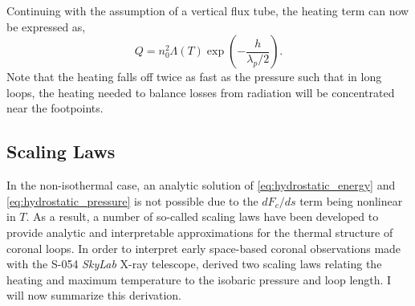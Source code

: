 Continuing with the assumption of a vertical flux tube, the heating term can now be expressed as,
\begin{equation}
    Q = n_0^2 \Lambda(T) \exp{\left(-\frac{h}{\lambda_p/2}\right)}.
\end{equation}
Note that the heating falls off twice as fast as the pressure such that in long loops, the heating needed to balance losses from radiation will be concentrated near the footpoints.

\subsection{Scaling Laws}\label{sec:scaling_laws}


In the non-isothermal case, an analytic solution of \autoref{eq:hydrostatic_energy} and \autoref{eq:hydrostatic_pressure} is not possible due to the $dF_c/ds$ term being nonlinear in $T$. As a result, a number of so-called scaling laws have been developed to provide analytic and interpretable approximations for the thermal structure of coronal loops. In order to interpret early space-based coronal observations made with the S-054 \textit{SkyLab} X-ray telescope, \citet{rosner_dynamics_1978} derived two scaling laws relating the heating and maximum temperature to the isobaric pressure and loop length. I will now summarize this derivation.


